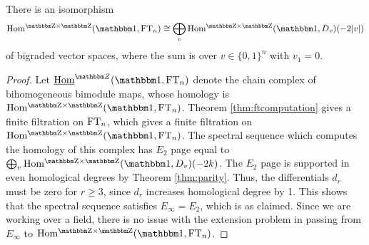 \begin{corollary}\label{cor:FThoms}
There is an isomorphism
\begin{equation}\label{eq:homOneFT}
\Homgg(\one,\FT_n)\cong \bigoplus_v \Homgg(\one,D_v)(-2|v|)
\end{equation}
of bigraded vector spaces, where the sum is over $v\in\{0,1\}^n$ with $v_1=0$.
\end{corollary}

\begin{proof}
Let $\Homc^{\Z}(\one,\FT_n)$ denote the chain complex of bihomogeneous bimodule maps, whose homology is $\Homgg(\one,\FT_n)$.  Theorem \ref{thm:ftcomputation} gives a finite filtration on $\operatorname{FT}_n$, which gives a finite filtration on $\Homgg(\one,\FT_n)$.  The spectral sequence which computes the homology of this complex has $E_2$ page equal to $\bigoplus_v \Homgg(\one,D_v)(-2k)$.  The $E_2$ page is supported in even homological degrees by Theorem \ref{thm:parity}.  Thus, the differentials $d_r$ must be zero for $r\geq 3$, since $d_r$ increases homological degree by 1.  This shows that the spectral sequence satisfies $E_\infty = E_2$, which is as claimed.  Since we are working over a field, there is no issue with the extension problem in passing from $E_\infty$ to $\Homgg(\one,\FT_n)$.
\end{proof}



